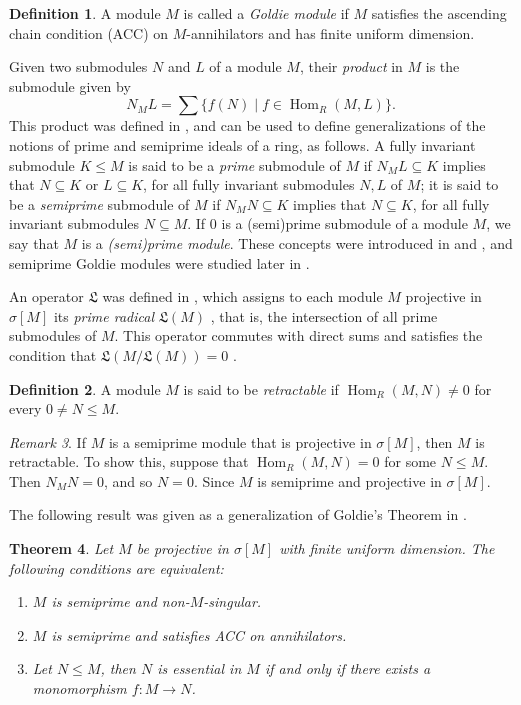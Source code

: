 \documentclass{amsart}
\newtheorem{thm}{Theorem}[section]
\theoremstyle{definition}
\newtheorem{defn}[thm]{Definition}
\theoremstyle{remark}
\newtheorem{rem}[thm]{Remark}
\numberwithin{equation}{section}
\DeclareMathOperator{\Hom}{Hom}
\newcommand{\sm}{\sigma[M]}
\begin{document}
	\begin{defn}
		A module $M$ is called a \emph{Goldie module} 
		if $M$ satisfies the ascending chain condition (ACC) on $M$-annihilators 
		and has finite uniform dimension.
	\end{defn}
	
	Given two submodules $N$ and $L$ of a module $M$, 
	their \emph{product} in $M$ is the submodule given by 
	\[N_ML=\sum\{f(N)\mid f\in\Hom_R(M,L)\}.\]
	This product was defined in \cite{BicanPr},
	and can be used to define generalizations
	of the notions of prime and semiprime ideals of a ring,
	as follows. 
	A fully invariant submodule $K\leq M$ 
	is said to be a \emph{prime} submodule of $M$
	if $N_ML\subseteq K$ implies that $N\subseteq K$ or $L\subseteq K$,
	for all fully invariant submodules $N, L$ of $M$;
	it is said to be a \emph{semiprime} submodule of $M$
	if $N_MN\subseteq K$ implies that $N\subseteq K$,
	for all fully invariant submodules $N\subseteq M$.
	If $0$ is a (semi)prime submodule of a module $M$, 
	we say that $M$ is a \emph{(semi)prime module}. 
	These concepts were introduced in \cite{raggiprime} and \cite{raggisemiprime}, 
	and semiprime Goldie modules were studied later in \cite{maugoldie}. 
	
	An operator $\mathfrak{L}$ was defined in \cite{mauprimerad}, 
	which assigns to each module $M$ projective in $\sm$ 
	its \emph{prime radical} $\mathfrak{L}(M)$ \cite[Corollary 3.12]{mauprimerad}, that is, the intersection of all prime submodules of $M$. 
	This operator commutes with direct sums \cite[Lemma 3.14]{mauprimerad} 
	and satisfies the condition that $\mathfrak{L}(M/\mathfrak{L}(M))=0$ 
	\cite[Proposition 3.9]{mauprimerad}. 
	
	\begin{defn}
		A module $M$ is said to be \emph{retractable} 
		if $\Hom_R(M,N)\neq 0$ for every $0\neq N\leq M$.
	\end{defn}
	
	\begin{rem}
		If $M$ is a semiprime module that is projective in $\sm$, 
		then $M$ is retractable. 
		To show this, suppose that $\Hom_R(M,N)=0$ for some $N\leq M$. 
		Then $N_MN=0$, and so $N=0$. 
		Since $M$ is semiprime and projective in $\sm$.
	\end{rem}
	
	The following result was given as a generalization of Goldie's Theorem in \cite[Theorem 2.8]{maugoldie}.
	
	\begin{thm}
		Let $M$ be projective in $\sm$ with finite uniform dimension. The following conditions are equivalent:
		\begin{enumerate}[label=\emph{(\alph*)}]
			\item $M$ is semiprime and non-$M$-singular.
			\item $M$ is semiprime and satisfies ACC on annihilators.
			\item Let $N\leq M$, then $N$ is essential in $M$ if and only if there exists a monomorphism $f:M\to N$.
		\end{enumerate}
	\end{thm}	
	
\end{document}
